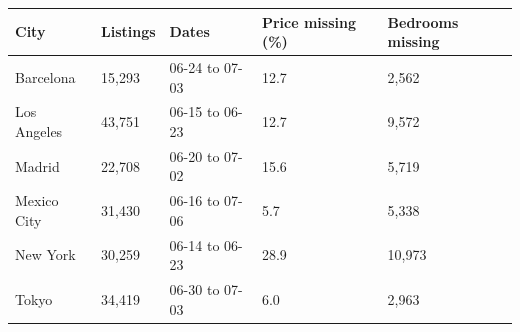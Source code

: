 \begin{tabular}{lllll}
\toprule
City & Listings & Dates & Price missing (\%) & Bedrooms missing \\
\midrule
Barcelona & 15,293 & 06-24 to 07-03 & 12.7 & 2,562 \\
Los Angeles & 43,751 & 06-15 to 06-23 & 12.7 & 9,572 \\
Madrid & 22,708 & 06-20 to 07-02 & 15.6 & 5,719 \\
Mexico City & 31,430 & 06-16 to 07-06 & 5.7 & 5,338 \\
New York & 30,259 & 06-14 to 06-23 & 28.9 & 10,973 \\
Tokyo & 34,419 & 06-30 to 07-03 & 6.0 & 2,963 \\
\bottomrule
\end{tabular}
